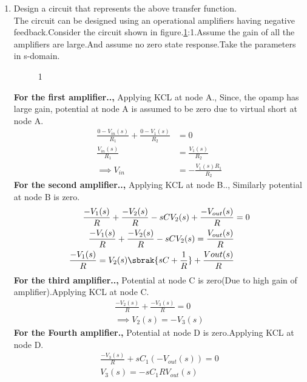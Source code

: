\begin{enumerate}[label=\arabic*.,ref=\theenumi]
\item Design a circuit that represents the above transfer function.\\
\solution The circuit can be designed using an operational amplifiers having negative feedback.Consider the circuit shown in figure.\ref{fig:equivalent_control_system}:1.Assume the gain of all the amplifiers are large.And assume no zero state response.Take the parameters in s-domain.\\
\begin{figure}[!hbt]
	\begin{center}
			\resizebox{\columnwidth}{!}{}
	\end{center}
\caption{1}
\label{fig:equivalent_control_system}
\end{figure}
\textbf{For the first amplifier..,}
Applying KCL at node A., 
Since, the opamp has large gain, potential at node A is assumed to be zero due to virtual short at node A.
\begin{align}
    \frac{0-V_{in}(s)}{R_1} +\frac{0-V_1(s)}{R_2} &= 0\\
    \frac{V_{in}(s)}{R_1} &= \frac{V_1(s)}{R_2}\\
\implies V_{in} &= -\frac{V_1(s) R_1}{R_2}\label{eq:ee18btech11005_opamp_1}
\end{align}
\textbf{For the second amplifier..,}
Applying KCL at node B..,
Similarly potential at node B is zero.
\begin{align}
  \frac{-V_1(s)}{R}+\frac{-V_2(s)}{R}-sCV_2(s)+\frac{-V_{out}(s)}{R} &= 0\\
  \frac{-V_1(s)}{R}+\frac{-V_2(s)}{R}-sCV_2(s) = \frac{V_{out}(s)}{R} \\
  \frac{-V_1(s)}{R} = V_2(s)\sbrak{sC+\frac{1}{R}}+\frac{V{out}(s)}{R} \label{eq:ee18btech11005_opamp_2}
\end{align}
\textbf{For the third amplifier..,}
Potential at node C is zero(Due to high gain of amplifier).Applying KCL at node C.
\begin{align}
    \frac{-V_2(s)}{R}+\frac{-V_3(s)}{R} = 0\\
    \implies V_2(s) = -V_3(s) \label{eq:ee18btech11005_opamp_3}
\end{align}
\textbf{For the Fourth amplifier.,}
Potential at node D is zero.Applying KCL at node D.
\begin{align}
    \frac{-V_3(s)}{R}+sC_1(-V_{out}(s)) = 0\\
    V_3(s) = -sC_1RV_{out}(s) \label{eq:ee18btech11005_opamp_4}

\end{align}
\end{enumerate}
